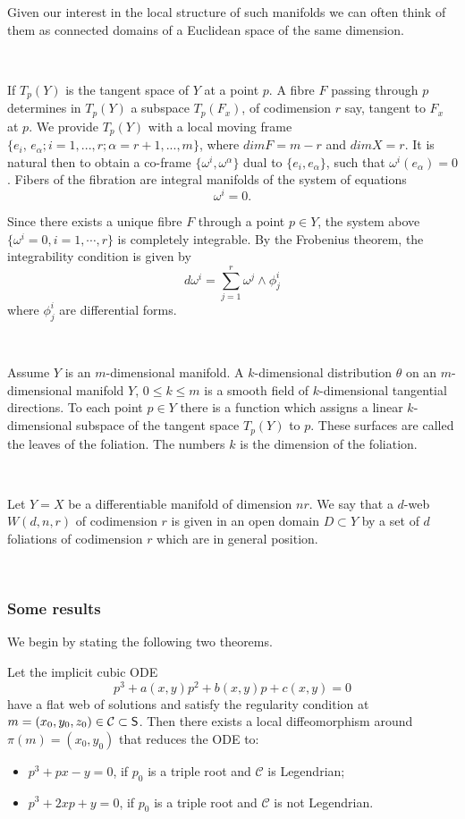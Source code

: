 Given our interest  in the local structure of such manifolds we can often think of them as connected domains of a Euclidean space of the same dimension.

\, 

If $T_{p}(Y)$ is the tangent space of $Y$ at a point ${p}$. A fibre $F$ passing through ${p}$ determines in $T_{p}(Y)$ a subspace $T_{p}(F_x)$, of codimension $r$ say, tangent to $F_x$ at ${p}$. We provide $T_{p}(Y)$ with a local moving frame $\{e_i,\,  e_\alpha; i=1,...,r; \alpha =r+1,...,m\}$, where $dim F =m - r$ and $dim X =r$. It is natural then to obtain a co-frame $\{\omega^i, \omega^\alpha\}$ dual to $\{e_i, e_\alpha\}$, such that  $\omega^i(e_{\alpha})=0$. Fibers of the fibration are integral manifolds of the system of equations $$\omega^i=0.$$

Since there exists a unique fibre $F$ through a point ${p}\in Y$, the system above $\{\omega^i=0, i=1,\cdots, r\}$ is completely integrable. By the Frobenius theorem, the integrability condition is given by 
\[d\omega^i=\sum_{j=1}^r\omega^j\wedge \phi^i_j\]
where $\phi^i_j$ are differential forms.

\, 

Assume $Y$ is an $m$-dimensional manifold. A $k$-dimensional distribution $\theta$ on an $m$-dimensional manifold $Y$, $0\leq k\leq m$ is a smooth field of $k$-dimensional tangential directions.  To each point ${p} \in Y$ there is a function which assigns a linear $k$-dimensional subspace of the tangent space $T_{p}(Y)$ to ${p}$. These surfaces are called the leaves of the foliation. The numbers $k$ is the dimension of the foliation.

\, 

Let $Y=X$ be a differentiable manifold of dimension $nr$. We  say that a $d$-web $W(d,n,r)$ of codimension $r$ is given in an open domain $D\subset Y$  by a set of $d$ foliations of codimension $r$ which are in general position. 

\, 
\subsubsection{Some results}
We begin by stating the following two theorems.

\begin{theorem}\label{thm:flatweb1}
Let the implicit cubic ODE
\[
p^3 + a(x, y)p^2 + b(x, y)p + c(x, y) = 0
\]
have a flat web of solutions and satisfy the regularity condition at 
$m = (x_0, y_0, z_0) \in \mathcal{C} \subset \mathsf{S}$. Then there exists a local diffeomorphism around $\pi(m) = (x_0, y_0)$ that reduces the ODE to:
\begin{itemize}
    \item $p^3 + px - y = 0$, if $p_0$ is a triple root and $\mathcal{C}$ is Legendrian;
    \item $p^3 + 2xp + y = 0$, if $p_0$ is a triple root and $\mathcal{C}$ is not Legendrian.
\end{itemize}
\end{theorem}

